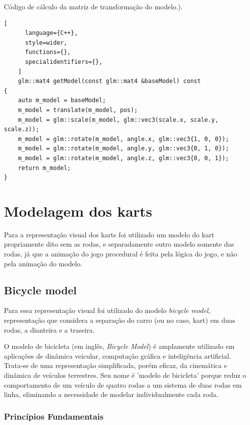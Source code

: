 \begin{programruledcaption}{Código de cálculo da matriz de transformação do modelo.).\label{prog:model}}
    \begin{lstlisting}[
      language={C++},
      style=wider,
      functions={},
      specialidentifiers={},
    ]
    glm::mat4 getModel(const glm::mat4 &baseModel) const
{
    auto m_model = baseModel;
    m_model = translate(m_model, pos);
    m_model = glm::scale(m_model, glm::vec3(scale.x, scale.y, scale.z));
    m_model = glm::rotate(m_model, angle.x, glm::vec3{1, 0, 0});
    m_model = glm::rotate(m_model, angle.y, glm::vec3{0, 1, 0});
    m_model = glm::rotate(m_model, angle.z, glm::vec3{0, 0, 1});
    return m_model;
}
    \end{lstlisting}
\end{programruledcaption}

\section{Modelagem dos karts}

Para a representação visual dos karts foi utilizado um modelo do kart propriamente dito sem as rodas, e separadamente outro modelo somente das rodas, já que a animação do jogo procedural é feita pela lógica do jogo, e não pela animação do modelo.

\subsection{Bicycle model}

Para essa representação visual foi utilizado do modelo \textit{bicycle model}, representação que considera a separação do carro (ou no caso, kart) em duas rodas, a dianteira e a traseira.

O modelo de bicicleta (em inglês, \textit{Bicycle Model}) é amplamente utilizado em aplicações de dinâmica veicular, computação gráfica e inteligência artificial. Trata-se de uma representação simplificada, porém eficaz, da cinemática e dinâmica de veículos terrestres. Seu nome é 'modelo de bicicleta' porque reduz o comportamento de um veículo de quatro rodas a um sistema de duas rodas em linha, eliminando a necessidade de modelar individualmente cada roda.

\subsubsection{Princípios Fundamentais}

